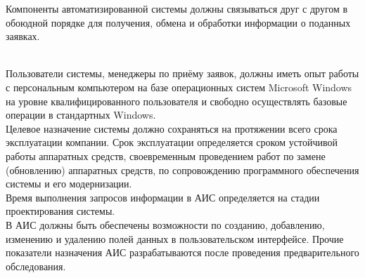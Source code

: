 \documentclass[russian, utf8, 12pt,pointsubsection,floatsubsection]{eskdtext}
\begin{document}

Компоненты автоматизированной системы должны связываться друг с другом в обоюдной порядке для получения, обмена и обработки информации о поданных заявках. 

\\
Пользователи системы, менеджеры по приёму заявок, должны иметь опыт работы с персональным компьютером на базе операционных систем Microsoft Windows на уровне квалифицированного пользователя и свободно осуществлять базовые операции в стандартных Windows.
\\
Целевое назначение системы должно сохраняться на протяжении всего срока эксплуатации компании. Срок эксплуатации определяется сроком устойчивой работы аппаратных средств, своевременным проведением работ по замене (обновлению) аппаратных средств, по сопровождению программного обеспечения системы и его модернизации.\\
Время выполнения запросов информации в АИС определяется на стадии проектирования системы.\\
В АИС должны быть обеспечены возможности по созданию, добавлению, изменению и удалению полей данных в пользовательском интерфейсе.
Прочие показатели назначения АИС разрабатываются после проведения предварительного обследования.
\end{document}
